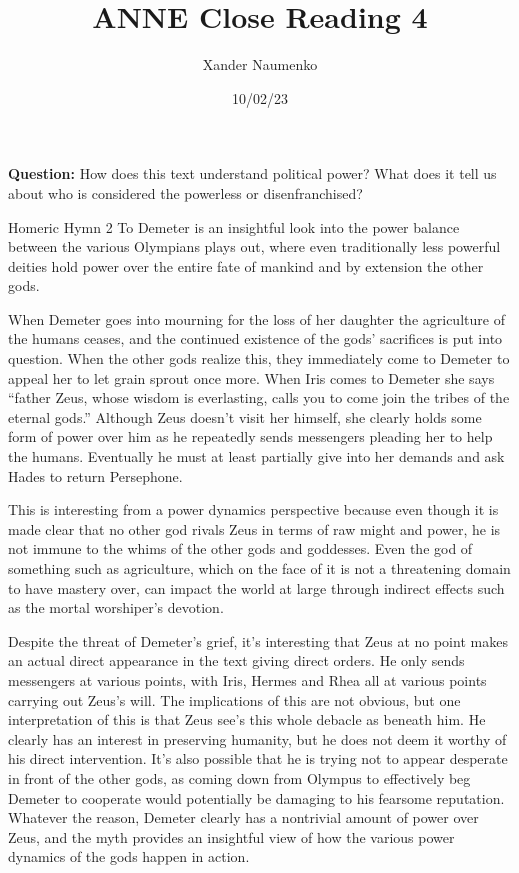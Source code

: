 \documentclass[letterpaper, reqno,11pt]{article}
\begin{document}
\title{ANNE Close Reading 4}
\date{10/02/23}
\author{Xander Naumenko}
\maketitle

{\bf Question:} How does this text understand political power? What does it tell us about who is considered the powerless or disenfranchised?   

Homeric Hymn 2 To Demeter is an insightful look into the power balance between the various Olympians plays out, where even traditionally less powerful deities hold power over the entire fate of mankind and by extension the other gods. 

\medskip 

When Demeter goes into mourning for the loss of her daughter the agriculture of the humans ceases, and the continued existence of the gods' sacrifices is put into question. When the other gods realize this, they immediately come to Demeter to appeal her to let grain sprout once more. When Iris comes to Demeter she says ``father Zeus, whose wisdom is everlasting, calls you to come join the tribes of the eternal gods.'' Although Zeus doesn't visit her himself, she clearly holds some form of power over him as he repeatedly sends messengers pleading her to help the humans. Eventually he must at least partially give into her demands and ask Hades to return Persephone. 

\medskip

This is interesting from a power dynamics perspective because even though it is made clear that no other god rivals Zeus in terms of raw might and power, he is not immune to the whims of the other gods and goddesses. Even the god of something such as agriculture, which on the face of it is not a threatening domain to have mastery over, can impact the world at large through indirect effects such as the mortal worshiper's devotion. 

\medskip

Despite the threat of Demeter's grief, it's interesting that Zeus at no point makes an actual direct appearance in the text giving direct orders. He only sends messengers at various points, with Iris, Hermes and Rhea all at various points carrying out Zeus's will. The implications of this are not obvious, but one interpretation of this is that Zeus see's this whole debacle as beneath him. He clearly has an interest in preserving humanity, but he does not deem it worthy of his direct intervention. It's also possible that he is trying not to appear desperate in front of the other gods, as coming down from Olympus to effectively beg Demeter to cooperate would potentially be damaging to his fearsome reputation. Whatever the reason, Demeter clearly has a nontrivial amount of power over Zeus, and the myth provides an insightful view of how the various power dynamics of the gods happen in action. 
 
\end{document}
